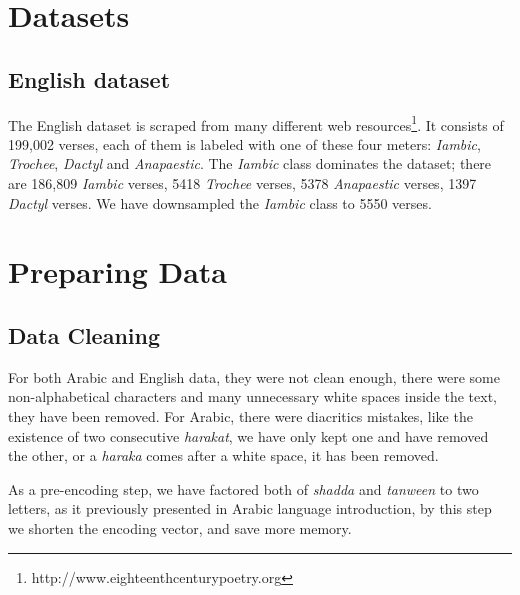 \documentclass[12pt]{report}
\begin{document}



\section*{Datasets}


\subsection*{English dataset}
The English dataset is scraped from many different web
resources\footnote{http://www.eighteenthcenturypoetry.org}. It consists of 199,002
verses, each of them is labeled with one of these four meters: \textit{Iambic},
\textit{Trochee}, \textit{Dactyl} and \textit{Anapaestic}.  The \textit{Iambic}
class dominates the dataset; there are  186,809 \textit{Iambic} verses, 5418
\textit{Trochee} verses, 5378  \textit{Anapaestic} verses, 1397 \textit{Dactyl}
verses.  We have downsampled the \textit{Iambic} class to 5550 verses.

\section*{Preparing Data}


\subsection*{Data Cleaning}

For both Arabic and English data, they were not clean enough, there were some
non-alphabetical characters and many unnecessary white spaces inside the text,
they have been removed.  For Arabic, there were diacritics mistakes, like the
existence of two consecutive \textit{harakat}, we have only kept one and have
removed the other, or a \textit{haraka} comes after a white space, it has been
removed. 

As a pre-encoding step, we have factored both of \textit{shadda} and
\textit{tanween} to two letters, as it previously presented in Arabic language
introduction,  by this step we shorten the encoding vector, and save more memory.
\end{document}
